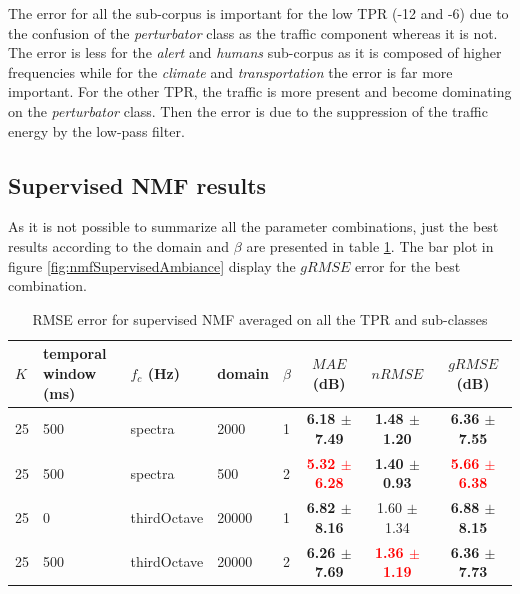 \documentclass[twocolumn,a4paper,10pt]{article}
\begin{document}
The error for all the sub-corpus is important for the low TPR (-12 and -6) due to the confusion of the \textit{perturbator} class as the traffic component whereas  it is not. The error is less for the \textit{alert} and \textit{humans} sub-corpus as it is composed of higher frequencies while for the \textit{climate} and \textit{transportation} the error is far more important. For the other TPR, the traffic is more present and become dominating on the \textit{perturbator} class. Then the error is due to the suppression of the traffic energy by the low-pass filter. 

\subsection{Supervised NMF results}

As it is not possible to summarize all the parameter combinations, just the best results according to the domain and $\beta$ are presented in table \ref{tab:results_supervised}. The bar plot in figure \ref{fig:nmfSupervisedAmbiance} display the $gRMSE$ error for the best combination.

\begin{table}[h]
\centering
\begin{tabular}{lllllccc} 
$K$ & \shortstack{temporal\\window (ms)} & $f_c$ (Hz) & domain & $\beta$ & $MAE$ (dB) & $nRMSE$ & $gRMSE$ (dB)\\ 
\hline 
 25 & 500 & spectra &  2000 & 1 & \textbf{6.18 $\pm$7.49} & \textbf{1.48 $\pm$1.20} & \textbf{6.36 $\pm$7.55} \\ 
 25 & 500 & spectra &   500 & 2 & \textbf{\textcolor{red}{5.32 $\pm$6.28}} & \textbf{1.40 $\pm$0.93} & \textbf{\textcolor{red}{5.66 $\pm$6.38}} \\ 
 25 & 0 & thirdOctave & 20000 & 1 & \textbf{6.82 $\pm$8.16} & 1.60 $\pm$1.34 & \textbf{6.88 $\pm$8.15} \\ 
 25 & 500 & thirdOctave & 20000 & 2 & \textbf{6.26 $\pm$7.69} & \textbf{\textcolor{red}{1.36 $\pm$1.19}} & \textbf{6.36 $\pm$7.73} \\ 
\end{tabular} 
\caption{RMSE error for supervised NMF averaged on all the TPR and sub-classes}
\label{tab:results_supervised}
\end{table}
\end{document}
